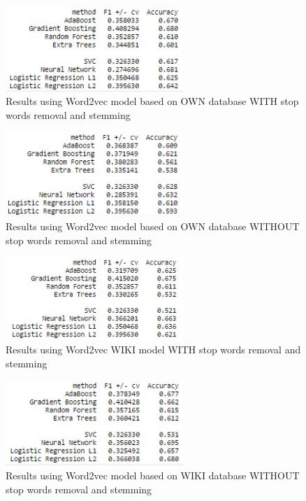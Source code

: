 \documentclass[12pt,a4paper]{article}
\begin{document}
\begin{figure}
\centering
\includegraphics[width=0.6\textwidth]{figures/results_w2v.jpg}
\caption{Results using Word2vec model based on OWN database WITH stop words removal and stemming}
\label{fig:w2v}
\end{figure}

\begin{figure}
\centering
\includegraphics[width=0.6\textwidth]{figures/results_w2v_nostem_noswr.jpg}
\caption{Results using Word2vec model based on OWN database WITHOUT stop words removal and stemming}
\label{fig:w2v_nostem_noswr}
\end{figure}

\begin{figure}
\centering
\includegraphics[width=0.6\textwidth]{figures/results_w2v_wiki.jpg}
\caption {Results using Word2vec WIKI model WITH stop words removal and stemming}
\label{fig:w2v_wiki}
\end{figure}

\begin{figure}
\centering
\includegraphics[width=0.6\textwidth]{figures/results_w2v_wiki_nostem_noswr.jpg}
\caption{Results using Word2vec model based on WIKI database WITHOUT stop words removal and stemming}
\label{fig:w2v_wiki_nostem_noswr}
\end{figure}
\end{document}
